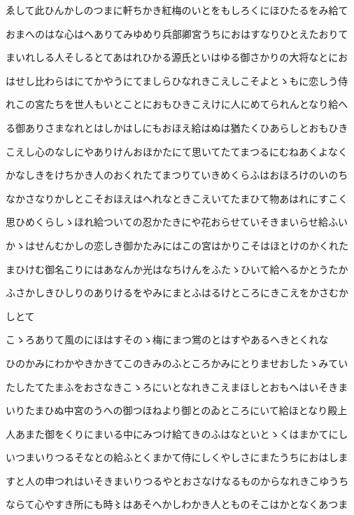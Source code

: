 \documentclass[a4paper,11pt,landscape]{ltjtarticle}
\begin{document}
\par\medskip
ゑして此ひんかしのつまに軒ちかき紅梅のいとをもしろくにほひたるをみ給て
\par\medskip
おまへのはな心はへありてみゆめり兵部卿宮うちにおはすなりひとえたおりて
\par\medskip
まいれしる人そしるとてあはれひかる源氏といはゆる御さかりの大将なとにお
\par\medskip
はせし比わらはにてかやうにてましらひなれきこえしこそよとゝもに恋しう侍
\par\medskip
れこの宮たちを世人もいとことにおもひきこえけに人にめてられんとなり給へ
\par\medskip
る御ありさまなれとはしかはしにもおほえ給はぬは猶たくひあらしとおもひき
\par\medskip
こえし心のなしにやありけんおほかたにて思いてたてまつるにむねあくよなく
\par\medskip
かなしきをけちかき人のおくれたてまつりていきめくらふはおほろけのいのち
\par\medskip
なかさなりかしとこそおほえはへれなときこえいてたまひて物あはれにすこく
\par\medskip
思ひめくらしゝほれ給ついての忍かたきにや花おらせていそきまいらせ給ふい
\par\medskip
かゝはせんむかしの恋しき御かたみにはこの宮はかりこそはほとけのかくれた
\par\medskip
まひけむ御名こりにはあなんか光はなちけんをふたゝひいて給へるかとうたか
\par\medskip
ふさかしきひしりのありけるをやみにまとふはるけところにきこえをかさむか
\par\medskip
しとて
\par\medskip
こゝろありて風のにほはすそのゝ梅にまつ鴬のとはすやあるへきとくれな
\par\medskip
ひのかみにわかやきかきてこのきみのふところかみにとりませおしたゝみてい
\par\medskip
たしたてたまふをおさなきこゝろにいとなれきこえまほしとおもへはいそきま
\par\medskip
いりたまひぬ中宮のうへの御つほねより御とのゐところにいて給ほとなり殿上
\par\medskip
人あまた御をくりにまいる中にみつけ給てきのふはなといとゝくはまかてにし
\par\medskip
いつまいりつるそなとの給ふとくまかて侍にしくやしさにまたうちにおはしま
\par\medskip
すと人の申つれはいそきまいりつるやとおさなけなるものからなれきこゆうち
\par\medskip
ならて心やすき所にも時〻はあそへかしわかき人とものそこはかとなくあつま
\end{document}
